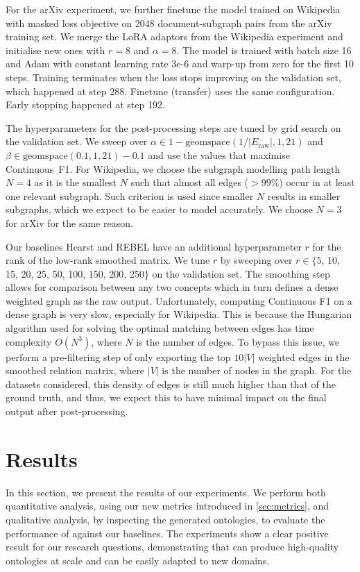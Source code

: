 For the arXiv experiment, we further finetune the model trained on Wikipedia with masked loss objective on 2048 document-subgraph pairs from the arXiv training set. We merge the LoRA adaptors from the Wikipedia experiment and initialise new ones with $r=8$ and $\alpha=8$. The model is trained with batch size 16 and Adam with constant learning rate 3e-6 and warp-up from zero for the first 10 steps. Training terminates when the loss stops improving on the validation set, which happened at step 288. Finetune (transfer) uses the same configuration. Early stopping happened at step 192.

The hyperparameters for the post-processing steps are tuned by grid search on the validation set. We sweep over $\alpha \in 1 - \text{geomspace}(1 / |E_\text{raw}|, 1, 21)$ and $\beta \in \text{geomspace}(0.1, 1, 21) - 0.1$ and use the values that maximise Continuous~F1. For Wikipedia, we choose the subgraph modelling path length $N=4$ as it is the smallest $N$ such that almost all edges ($>99\%$) occur in at least one relevant subgraph. Such criterion is used since smaller $N$ results in smaller subgraphs, which we expect to be easier to model accurately. We choose $N=3$ for arXiv for the same reason.

Our baselines Hearst and REBEL have an additional hyperparameter $r$ for the rank of the low-rank smoothed matrix. We tune $r$ by sweeping over $r \in \{$5, 10, 15, 20, 25, 50, 100, 150, 200, 250$\}$ on the validation set. The smoothing step allows for comparison between any two concepts which in turn defines a dense weighted graph as the raw output. Unfortunately, computing Continuous F1 on a dense graph is very slow, especially for Wikipedia. This is because the Hungarian algorithm used for solving the optimal matching between edges has time complexity $O(N^3)$, where $N$ is the number of edges. To bypass this issue, we perform a pre-filtering step of only exporting the top $10|V|$ weighted edges in the smoothed relation matrix, where $|V|$ is the number of nodes in the graph. For the datasets considered, this density of edges is still much higher than that of the ground truth, and thus, we expect this to have minimal impact on the final output after post-processing.

\section{Results}  \label{sec:results}

In this section, we present the results of our experiments. We perform both quantitative analysis, using our new metrics introduced in \cref{sec:metrics}, and qualitative analysis, by inspecting the generated ontologies, to evaluate the performance of \name against our baselines. The experiments show a clear positive result for our research questions, demonstrating that \name can produce high-quality ontologies at scale and can be easily adapted to new domains.

